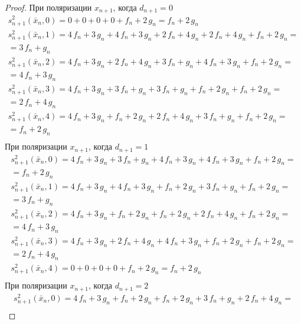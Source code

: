 \documentclass[bibliography=totoc, a4paper, 14pt]{extarticle}
\begin{document}
 \begin{proof}


При поляризации $x_{n+1}$, когда $d_{n+1} = 0$
$$\begin{array}{l}
s_{n+1}^2(\bar{x}_n, 0) = 0 + 0 + 0 + 0 + f_n + 2\,g_n = f_n + 2\,g_n \\
s_{n+1}^2(\bar{x}_n, 1) = 4\,f_n + 3\,g_n + 4\,f_n + 3\,g_n + 2\,f_n + 4\,g_n + 2\,f_n + 4\,g_n + f_n + 2\,g_n =\\
= 3\,f_n + g_n \\
s_{n+1}^2(\bar{x}_n, 2) = 4\,f_n + 3\,g_n + 2\,f_n + 4\,g_n + 3\,f_n + g_n + 4\,f_n + 3\,g_n + f_n + 2\,g_n =\\
= 4\,f_n + 3\,g_n \\
s_{n+1}^2(\bar{x}_n, 3) = 4\,f_n + 3\,g_n + 3\,f_n + g_n + 3\,f_n + g_n + f_n + 2\,g_n + f_n + 2\,g_n =\\
= 2\,f_n + 4\,g_n \\
s_{n+1}^2(\bar{x}_n, 4) = 4\,f_n + 3\,g_n + f_n + 2\,g_n + 2\,f_n + 4\,g_n + 3\,f_n + g_n + f_n + 2\,g_n =\\
= f_n + 2\,g_n \\
\end{array}$$
При поляризации $x_{n+1}$, когда $d_{n+1} = 1$
$$\begin{array}{l}
s_{n+1}^2(\bar{x}_n, 0) = 4\,f_n + 3\,g_n + 3\,f_n + g_n + 4\,f_n + 3\,g_n + 4\,f_n + 3\,g_n + f_n + 2\,g_n =\\
= f_n + 2\,g_n \\
s_{n+1}^2(\bar{x}_n, 1) = 4\,f_n + 3\,g_n + 4\,f_n + 3\,g_n + f_n + 2\,g_n + 3\,f_n + g_n + f_n + 2\,g_n =\\
= 3\,f_n + g_n \\
s_{n+1}^2(\bar{x}_n, 2) = 4\,f_n + 3\,g_n + f_n + 2\,g_n + f_n + 2\,g_n + 2\,f_n + 4\,g_n + f_n + 2\,g_n =\\
= 4\,f_n + 3\,g_n \\
s_{n+1}^2(\bar{x}_n, 3) = 4\,f_n + 3\,g_n + 2\,f_n + 4\,g_n + 4\,f_n + 3\,g_n + f_n + 2\,g_n + f_n + 2\,g_n =\\
= 2\,f_n + 4\,g_n \\
s_{n+1}^2(\bar{x}_n, 4) = 0 + 0 + 0 + 0 + f_n + 2\,g_n = f_n + 2\,g_n \\
\end{array}$$
При поляризации $x_{n+1}$, когда $d_{n+1} = 2$
$$\begin{array}{l}
s_{n+1}^2(\bar{x}_n, 0) = 4\,f_n + 3\,g_n + f_n + 2\,g_n + f_n + 2\,g_n + 3\,f_n + g_n + 2\,f_n + 4\,g_n =\\

\end{array}$$
\end{proof}
\end{document}
